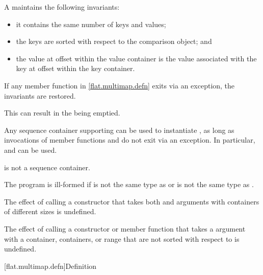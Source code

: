 \pnum
A  maintains the following invariants:
\begin{itemize}
\item
it contains the same number of keys and values;
\item
the keys are sorted with respect to the comparison object; and
\item
the value at offset  within the value container is the value
associated with the key at offset  within the key container.
\end{itemize}

\pnum
If any member function in \ref{flat.multimap.defn} exits via an exception,
the invariants are restored.
\begin{note}
This can result in the  being emptied.
\end{note}

\pnum
Any sequence container 
supporting  can be used to
instantiate ,
as long as invocations of
member functions  and  do not exit via an exception.
In particular,
 and  can be used.
\begin{note}
 is not a sequence container.
\end{note}

\pnum
The program is ill-formed if
 is not the same type as  or
 is not the same type as .

\pnum
The effect of calling a constructor
that takes both  and
 arguments
with containers of different sizes is undefined.

\pnum
The effect of calling a constructor or member function
that takes a  argument
with a container, containers, or range
that are not sorted with respect to  is undefined.

[flat.multimap.defn]{Definition}

